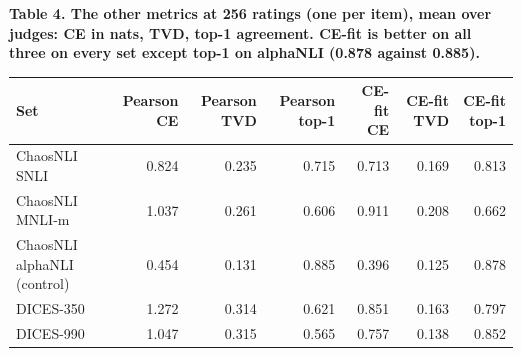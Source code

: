 \documentclass[10pt]{article}
\begin{document}
\textbf{Table 4. The other metrics at 256 ratings (one per item), mean over judges: CE in nats, TVD, top-1 agreement. CE-fit is better on all three on every set except top-1 on alphaNLI (0.878 against 0.885).}\par
\footnotesize
\begin{tabular}{lrrrrrr}\toprule
Set & Pearson CE & Pearson TVD & Pearson top-1 & CE-fit CE & CE-fit TVD & CE-fit top-1 \\ \midrule
ChaosNLI SNLI & 0.824 & 0.235 & 0.715 & 0.713 & 0.169 & 0.813 \\
ChaosNLI MNLI-m & 1.037 & 0.261 & 0.606 & 0.911 & 0.208 & 0.662 \\
ChaosNLI alphaNLI (control) & 0.454 & 0.131 & 0.885 & 0.396 & 0.125 & 0.878 \\
DICES-350 & 1.272 & 0.314 & 0.621 & 0.851 & 0.163 & 0.797 \\
DICES-990 & 1.047 & 0.315 & 0.565 & 0.757 & 0.138 & 0.852 \\
\bottomrule\end{tabular}
\end{document}
